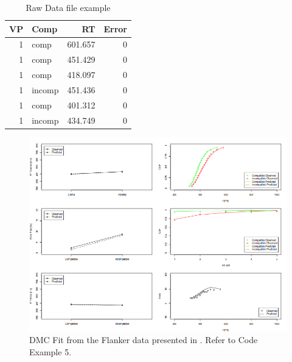 \begin{longtable}{rlrr}
\caption{Raw Data file example} \\ 
  \hline
VP & Comp & RT & Error \\ 
  \hline
   1 & comp & 601.657 &    0 \\ 
     1 & comp & 451.429 &    0 \\ 
     1 & comp & 418.097 &    0 \\ 
     1 & incomp & 451.436 &    0 \\ 
     1 & comp & 401.312 &    0 \\ 
     1 & incomp & 434.749 &    0 \\ 
   \hline
\hline
\end{longtable}


\begin{figure}[H]
    \includegraphics[width=1\textwidth]{../figures/figure5.png}
    \caption{DMC Fit from the Flanker data presented in \textcite{ulrich2015automatic}. Refer to Code Example 5.}
    \label{fig:5}
\end{figure}


